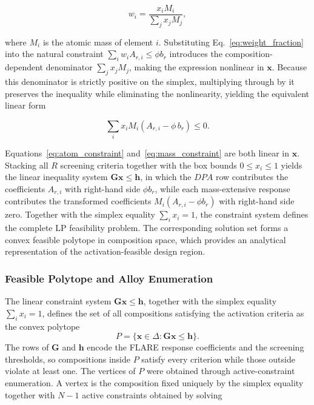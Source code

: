 \begin{equation}
w_i = \frac{x_i M_i}{\sum_j x_j M_j} ,
\label{eq:weight_fraction}
\end{equation}

where \(M_i\) is the atomic mass of element \(i\). Substituting
Eq.~\eqref{eq:weight_fraction} into the natural constraint
\(\sum_i w_i A_{r,i} \le \phi b_r\) introduces the composition-dependent
denominator \(\sum_j x_j M_j\), making the expression nonlinear in
\(\mathbf{x}\). Because this denominator is strictly positive on the simplex,
multiplying through by it preserves the inequality while eliminating the
nonlinearity, yielding the equivalent linear form

\begin{equation}
\sum_i x_i M_i \left(A_{r,i} - \phi\, b_r\right) \le 0 .
\label{eq:mass_constraint}
\end{equation}

Equations~\eqref{eq:atom_constraint} and~\eqref{eq:mass_constraint} are both
linear in \(\mathbf{x}\). Stacking all \(R\) screening criteria together with
the box bounds \(0\le x_i \le 1\) yields the linear inequality system
\(\mathbf{G}\mathbf{x}\le\mathbf{h}\), in which the \(DPA\) row contributes the
coefficients \(A_{r,i}\) with right-hand side \(\phi b_r\), while each
mass-extensive response contributes the transformed coefficients
\(M_i(A_{r,i}-\phi b_r)\) with right-hand side zero. Together with the simplex
equality \(\sum_i x_i = 1\), the constraint system defines the complete LP feasibility problem. The corresponding solution set forms a convex feasible polytope in composition space, which provides an analytical representation of the activation-feasible design region.


\subsubsection{Feasible Polytope and Alloy Enumeration}

The linear constraint system \(\mathbf{G}\mathbf{x}\le\mathbf{h}\), together with
the simplex equality \(\sum_i x_i=1\), defines the set of all compositions
satisfying the activation criteria as the convex polytope
\[
P=\{\mathbf{x}\in\Delta:\mathbf{G}\mathbf{x}\le\mathbf{h}\}.
\]
The rows of \(\mathbf{G}\) and \(\mathbf{h}\) encode the FLARE response
coefficients and the screening thresholds, so compositions inside \(P\) satisfy
every criterion while those outside violate at least one. The vertices of \(P\)
were obtained through active-constraint enumeration. A vertex is the composition
fixed uniquely by the simplex equality together with \(N-1\) active constraints obtained by solving

